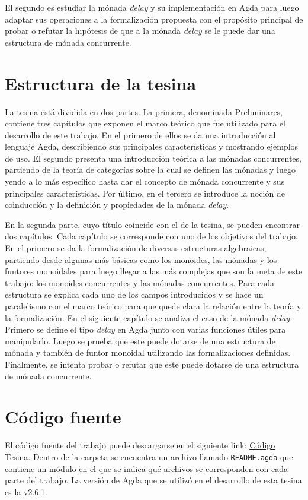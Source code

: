 El segundo es estudiar la mónada \textit{delay} y su implementación en Agda para luego adaptar sus operaciones a la formalización propuesta con el propósito principal de probar o refutar la hipótesis de que a la mónada \textit{delay} se le puede dar una estructura de mónada concurrente.

\section{Estructura de la tesina}

La tesina está dividida en dos partes. La primera, denominada Preliminares, contiene tres capítulos que exponen el marco teórico que fue utilizado para el desarrollo de este trabajo. En el primero de ellos se da una introducción al lenguaje Agda, describiendo sus principales características y mostrando ejemplos de uso. El segundo presenta una introducción teórica a las mónadas concurrentes, partiendo de la teoría de categorías sobre la cual se definen las mónadas y luego yendo a lo más específico hasta dar el concepto de mónada concurrente y sus principales características. Por último, en el tercero se introduce la noción de coinducción y la definición y propiedades de la mónada \textit{delay}. 

En la segunda parte, cuyo título coincide con el de la tesina, se pueden encontrar dos capítulos. Cada capítulo se corresponde con uno de los objetivos del trabajo. En el primero se da la formalización de diversas estructuras algebraicas, partiendo desde algunas más básicas como los monoides, las mónadas y los funtores monoidales para luego llegar a las más complejas que son la meta de este trabajo: los monoides concurrentes y las mónadas concurrentes. Para cada estructura se explica cada uno de los campos introducidos y se hace un paralelismo con el marco teórico para que quede clara la relación entre la teoría y la formalización. En el siguiente capítulo se analiza el caso de la mónada \textit{delay}. Primero se define el tipo \textit{delay} en Agda junto con varias funciones útiles para manipularlo. Luego se prueba que este puede dotarse de una estructura de mónada y también de funtor monoidal utilizando las formalizaciones definidas. Finalmente, se intenta probar o refutar que este puede dotarse de una estructura de mónada concurrente.

\section{Código fuente}

El código fuente del trabajo puede descargarse en el siguiente link: \href{https://github.com/ValeBini/Tesina/releases/tag/v1.2}{Código Tesina}. Dentro de la carpeta se encuentra un archivo llamado \texttt{README.agda} que contiene un módulo  en el que se indica qué archivos se corresponden con cada parte del trabajo. La versión de Agda que se utilizó en el desarrollo de esta tesina es la v2.6.1. 